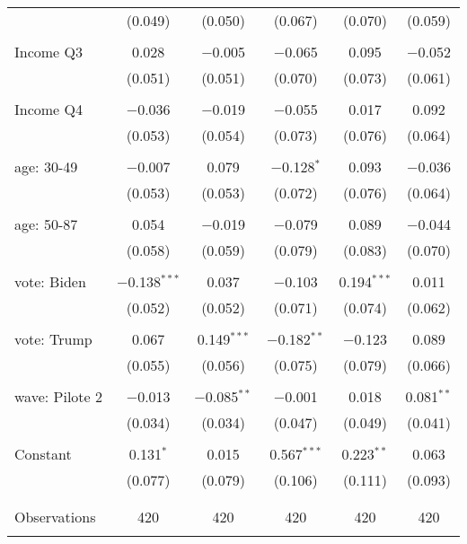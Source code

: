 \begin{tabular}{@{\extracolsep{5pt}}lccccc}
  & (0.049) & (0.050) & (0.067) & (0.070) & (0.059) \\ 
  & & & & & \\ 
 Income Q3 & 0.028 & $-$0.005 & $-$0.065 & 0.095 & $-$0.052 \\ 
  & (0.051) & (0.051) & (0.070) & (0.073) & (0.061) \\ 
  & & & & & \\ 
 Income Q4 & $-$0.036 & $-$0.019 & $-$0.055 & 0.017 & 0.092 \\ 
  & (0.053) & (0.054) & (0.073) & (0.076) & (0.064) \\ 
  & & & & & \\ 
 age: 30-49 & $-$0.007 & 0.079 & $-$0.128$^{*}$ & 0.093 & $-$0.036 \\ 
  & (0.053) & (0.053) & (0.072) & (0.076) & (0.064) \\ 
  & & & & & \\ 
 age: 50-87 & 0.054 & $-$0.019 & $-$0.079 & 0.089 & $-$0.044 \\ 
  & (0.058) & (0.059) & (0.079) & (0.083) & (0.070) \\ 
  & & & & & \\ 
 vote: Biden & $-$0.138$^{***}$ & 0.037 & $-$0.103 & 0.194$^{***}$ & 0.011 \\ 
  & (0.052) & (0.052) & (0.071) & (0.074) & (0.062) \\ 
  & & & & & \\ 
 vote: Trump & 0.067 & 0.149$^{***}$ & $-$0.182$^{**}$ & $-$0.123 & 0.089 \\ 
  & (0.055) & (0.056) & (0.075) & (0.079) & (0.066) \\ 
  & & & & & \\ 
 wave: Pilote 2 & $-$0.013 & $-$0.085$^{**}$ & $-$0.001 & 0.018 & 0.081$^{**}$ \\ 
  & (0.034) & (0.034) & (0.047) & (0.049) & (0.041) \\ 
  & & & & & \\ 
 Constant & 0.131$^{*}$ & 0.015 & 0.567$^{***}$ & 0.223$^{**}$ & 0.063 \\ 
  & (0.077) & (0.079) & (0.106) & (0.111) & (0.093) \\ 
  & & & & & \\ 
\hline \\[-1.8ex] 

Observations & 420 & 420 & 420 & 420 & 420 \\ 
\hline 
\hline \\[-1.8ex] 
\end{tabular} 